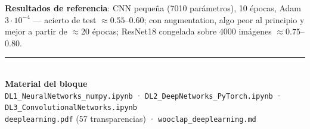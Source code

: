 \documentclass[10pt,a4paper]{article}
\begin{document}
\vspace{.4em}
\textbf{Resultados de referencia}: CNN pequeña (7010 parámetros), 10 épocas, Adam
$3\cdot10^{-4}$ — acierto de test $\approx0.55$--$0.60$; con augmentation, algo peor al
principio y mejor a partir de $\approx$20 épocas; ResNet18 congelada sobre 4000 imágenes
$\approx0.75$--$0.80$.

\vspace{1em}
{\color{uc3m}\rule{\textwidth}{.6pt}}\\[.3em]
\textbf{Material del bloque}\\[.2em]
\small
\texttt{DL1\_NeuralNetworks\_numpy.ipynb} · \texttt{DL2\_DeepNetworks\_PyTorch.ipynb} ·
\texttt{DL3\_ConvolutionalNetworks.ipynb}\\
\texttt{deeplearning.pdf} (57 transparencias) · \texttt{wooclap\_deeplearning.md}
\end{document}
